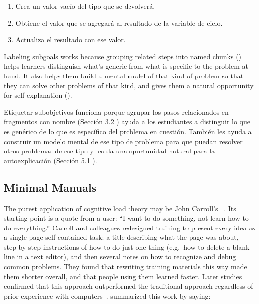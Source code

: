\begin{enumerate}

\item
  Crea un valor vacío del tipo que se devolverá.

\item
  Obtiene el valor que se agregará al resultado de la variable de ciclo.

\item
  Actualiza el resultado con ese valor.

\end{enumerate}

Labeling subgoals works because grouping related steps into named chunks ()
helps learners distinguish what's generic from what is specific to the problem at hand.
It also helps them build a mental model of that kind of problem
so that they can solve other problems of that kind,
and gives them a natural opportunity for self-explanation ().

Etiquetar subobjetivos funciona porque agrupar los pasos relacionados en fragmentos con nombre (Sección  3.2 ) ayuda a los estudiantes a distinguir lo que es genérico de lo que es específico del problema en cuestión. También les ayuda a construir un modelo mental de ese tipo de problema para que puedan resolver otros problemas de ese tipo y les da una oportunidad natural para la autoexplicación (Sección  5.1 ).

\subsection*{Minimal Manuals}

The purest application of cognitive load theory may be John Carroll's
~\cite{Carr1987,Carr2014}.
Its starting point is a quote from a user:
``I want to do something, not learn how to do everything.''
Carroll and colleagues redesigned training to present every idea as a single-page self-contained task:
a title describing what the page was about,
step-by-step instructions of how to do just one thing
(e.g.\ how to delete a blank line in a text editor),
and then several notes on how to recognize and debug common problems.
They found that rewriting training materials this way made them shorter overall,
and that people using them learned faster.
Later studies confirmed that this approach outperformed the traditional approach
regardless of prior experience with computers~\cite{Lazo1993}.
\cite{Carr2014} summarized this work by saying:

